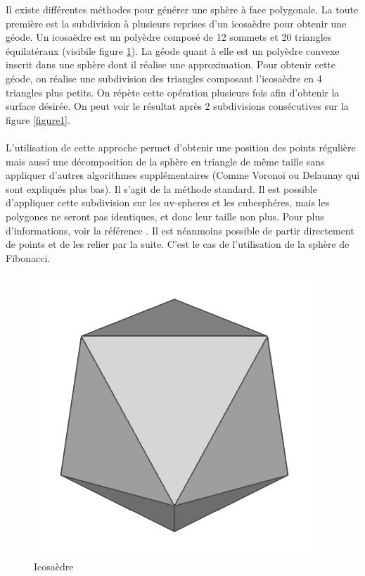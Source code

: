 \documentclass[a4paper]{article}
\begin{document}
Il existe différentes méthodes pour générer une sphère à face polygonale. La toute première est la subdivision à plusieurs reprises d'un  icosaèdre pour obtenir une géode. Un icosaèdre est un polyèdre composé de  12 sommets et 20 triangles équilatéraux (visibile figure  \ref{figure0}). La géode quant à elle est un polyèdre convexe inscrit dans une sphère dont il réalise une approximation. Pour obtenir cette géode, on réalise une subdivision des triangles composant l'icosaèdre en  4 triangles plus petits. On répète cette opération plusieurs fois afin d'obtenir la surface désirée. On peut voir le résultat après 2 subdivisions consécutives sur la figure \ref{figure1}.\\
\\
L'utilisation de cette approche permet d'obtenir une position des points régulière mais aussi une décomposition de la sphère en triangle de même taille sans appliquer d'autres algorithmes supplémentaires (Comme Voronoï ou Delaunay qui sont expliqués plus bas). Il s'agit de la méthode standard. Il est possible d'appliquer cette subdivision sur les uv-spheres et les cubesphéres, mais les polygones ne seront pas identiques, et donc leur taille non plus. Pour plus d'informations, voir la référence \cite{SongHoAhn}. Il est néanmoins possible de partir directement de points et de les relier par la suite. C'est le cas de l'utilisation de la sphère de Fibonacci.\\

\begin{figure}[!ht]
    \begin{center}
        \includegraphics[width=0.2\linewidth]{img/sphere/gl_sphere05.png}
        \caption{Icosaèdre\protect\footnotemark}
        \label{figure0}
    \end{center}
\end{figure}

\end{document}
